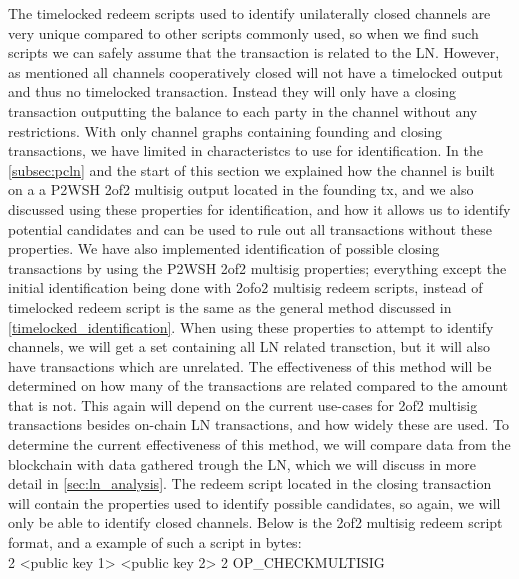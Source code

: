 The timelocked redeem scripts used to identify unilaterally closed channels are very unique compared to other scripts commonly used, so when we find such scripts we can safely assume that the transaction is related to the LN. However, as mentioned all channels cooperatively closed will not have a timelocked output and thus no timelocked transaction. Instead they will only have a closing transaction outputting the balance to each party in the channel without any restrictions. With only channel graphs containing founding and closing transactions, we have limited in characteristcs to use for identification. In the \cref{subsec:pcln} and the start of this section we explained how the channel is built on a a P2WSH 2of2 multisig output located in the founding tx, and we also discussed using these properties for identification, and how it allows us to identify potential candidates and can be used to rule out all transactions without these properties.
We have also implemented identification of possible closing transactions by using the P2WSH 2of2 multisig properties; everything except the initial identification being done with 2ofo2 multisig redeem scripts, instead of timelocked redeem script is the same as the general method discussed in \cref{timelocked_identification}.
 When using these properties to attempt to identify channels, we will get a set containing all LN related transction, but it will also have transactions which are unrelated. The effectiveness of this method will be determined on how many of the transactions are related compared to the amount that is not. This again will depend on the current use-cases for 2of2 multisig transactions besides on-chain LN transactions, and how widely these are used. To determine the current effectiveness of this method, we will compare data from the blockchain with data gathered trough the LN, which we will discuss in more detail in \cref{sec:ln_analysis}. 
 The redeem script located in the closing transaction will contain the properties used to identify possible candidates, so again, we will only be able to identify closed channels.
Below is the 2of2 multisig redeem script format, and a example of such a script in bytes:
\\

2 <public key 1> <public key 2> 2 OP\_CHECKMULTISIG
\\

\noindent [82 33 2 211 153 245 240 225 125 95 140 116 20 99 81 38 139 135 136 59 14 125 34 181 148 47 67 16 42 24 147 28 144 61 33 33 2 215 1 70 141 233 112 91 253 252 202 27 73 158 254 234 159 125 98 30 78 159 235 6 46 167 103 105 239 180 125 168 66 82 174]
\\

